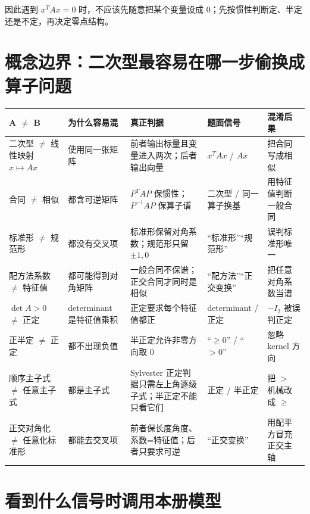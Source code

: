 \documentclass[11pt,a4paper]{ctexart}
\begin{document}
因此遇到 $x^TAx=0$ 时，不应该先随意把某个变量设成 $0$；先按惯性判断定、半定还是不定，再决定零点结构。

\section{概念边界：二次型最容易在哪一步偷换成算子问题}

\begin{longtable}{L{2.5cm}L{3.0cm}L{3.8cm}L{3.2cm}L{\dimexpr\linewidth-13.1cm\relax}}
\toprule
\textbf{A $\neq$ B} & \textbf{为什么容易混} & \textbf{真正判据} & \textbf{题面信号} & \textbf{混淆后果}\\
\midrule
二次型 $\neq$ 线性映射 $x\mapsto Ax$ & 使用同一张矩阵 & 前者输出标量且变量进入两次；后者输出向量 & $x^TAx$ / $Ax$ & 把合同写成相似\\
合同 $\neq$ 相似 & 都含可逆矩阵 & $P^TAP$ 保惯性；$P^{-1}AP$ 保算子谱 & 二次型 / 同一算子换基 & 用特征值判断一般合同\\
标准形 $\neq$ 规范形 & 都没有交叉项 & 标准形保留对角系数；规范形只留 $\pm1,0$ & “标准形”“规范形” & 误判标准形唯一\\
配方法系数 $\neq$ 特征值 & 都可能得到对角矩阵 & 一般合同不保谱；正交合同才同时是相似 & “配方法”“正交变换” & 把任意对角系数当谱\\
$\det A>0$ $\neq$ 正定 & determinant 是特征值乘积 & 正定要求每个特征值都正 & determinant / 正定 & $-I_2$ 被误判正定\\
正半定 $\neq$ 正定 & 都不出现负值 & 半正定允许非零方向取 $0$ & “$\ge0$” / “$>0$” & 忽略 kernel 方向\\
顺序主子式 $\neq$ 任意主子式 & 都是主子式 & Sylvester 正定判据只需左上角逐级子式；半正定不能只看它们 & 正定 / 半正定 & 把 $>$ 机械改成 $\ge$\\
正交对角化 $\neq$ 任意化标准形 & 都能去交叉项 & 前者保长度角度、系数=特征值；后者只要求可逆 & “正交变换” & 用配平方冒充正交主轴\\
\bottomrule
\end{longtable}

\section{看到什么信号时调用本册模型}
\end{document}
